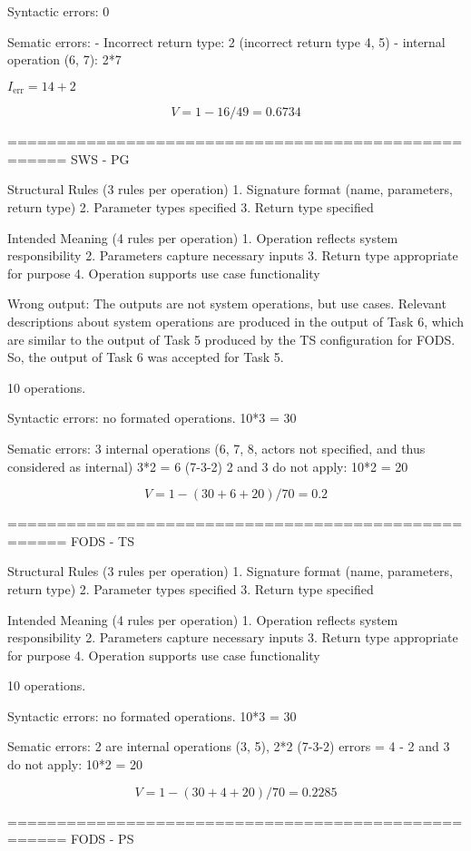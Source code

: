 Syntactic errors: 0 

Sematic errors: 
- Incorrect return type: 2 (incorrect return type 4, 5) 
- internal operation (6, 7): 2*7

$I_{\text{err}} = 14+2$

$$
V = 1 - 16/49 = 0.6734
$$

====================================================
SWS - PG

Structural Rules (3 rules per operation)
1. Signature format (name, parameters, return type)
2. Parameter types specified
3. Return type specified

Intended Meaning (4 rules per operation)
1. Operation reflects system responsibility
2. Parameters capture necessary inputs
3. Return type appropriate for purpose
4. Operation supports use case functionality

Wrong output: The outputs are not system operations, but use cases. Relevant descriptions about system operations are produced in the output of Task 6, 
which are similar to the output of Task 5 produced by the TS configuration for FODS. So, the output of Task 6 was accepted for Task 5. 

10 operations. 

Syntactic errors: no formated operations. 10*3 = 30

Sematic errors: 3 internal operations (6, 7, 8, actors not specified, and thus considered as internal) 3*2 = 6 (7-3-2)
2 and 3 do not apply: 10*2 = 20

\[
V = 1 - (30+6+20) /70 = 0.2
\]

====================================================
FODS - TS

Structural Rules (3 rules per operation)
1. Signature format (name, parameters, return type)
2. Parameter types specified
3. Return type specified

Intended Meaning (4 rules per operation)
1. Operation reflects system responsibility
2. Parameters capture necessary inputs
3. Return type appropriate for purpose
4. Operation supports use case functionality

10 operations. 

Syntactic errors: no formated operations. 10*3 = 30

Sematic errors: 2 are internal operations (3, 5), 2*2 (7-3-2) errors = 4
- 2 and 3 do not apply: 10*2 = 20

\[
V = 1 - (30+4+20)/70 = 0.2285
\]

====================================================
FODS - PS

